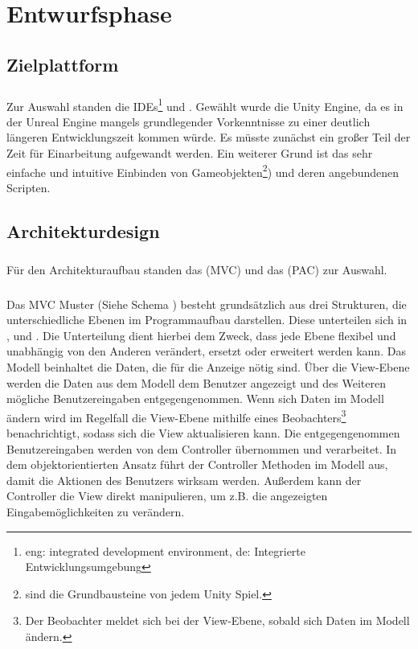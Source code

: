 \chapter{Entwurfsphase}
\section{Zielplattform}
\paragraph{}
Zur Auswahl standen die IDEs\footnote{eng: integrated development environment, de: Integrierte Entwicklungsumgebung}  und . Gewählt wurde die Unity Engine, da es in der Unreal Engine mangels grundlegender Vorkenntnisse zu einer deutlich längeren Entwicklungszeit kommen würde. Es müsste zunächst ein großer Teil der Zeit für Einarbeitung aufgewandt werden. 
Ein weiterer Grund ist das sehr einfache und intuitive Einbinden von Gameobjekten\footnote{ sind die Grundbausteine von jedem Unity Spiel.}) und deren angebundenen Scripten.

\section{Architekturdesign}
\paragraph{}
Für den Architekturaufbau standen das  (MVC) und das  (PAC) zur Auswahl.
\paragraph{}
Das MVC Muster (Siehe Schema ) besteht grundsätzlich aus drei Strukturen, die unterschiedliche Ebenen im Programmaufbau darstellen.
Diese unterteilen sich in ,  und . Die Unterteilung dient hierbei dem Zweck, dass jede Ebene flexibel und unabhängig von den Anderen verändert, ersetzt oder erweitert werden kann. 
Das Modell beinhaltet die Daten, die für die Anzeige nötig sind. Über die View-Ebene werden die Daten aus dem Modell dem Benutzer angezeigt und des Weiteren mögliche Benutzereingaben entgegengenommen. Wenn sich Daten im Modell ändern wird im Regelfall die View-Ebene mithilfe eines Beobachters\footnote{Der Beobachter meldet sich bei der View-Ebene, sobald sich Daten im Modell ändern.} benachrichtigt, sodass sich die View aktualisieren kann. Die entgegengenommen Benutzereingaben werden von dem Controller übernommen und verarbeitet. In dem objektorientierten Ansatz führt der Controller Methoden im Modell aus, damit die Aktionen des Benutzers wirksam werden. Außerdem kann der Controller die View direkt manipulieren, um z.B. die angezeigten Eingabemöglichkeiten zu verändern. 
